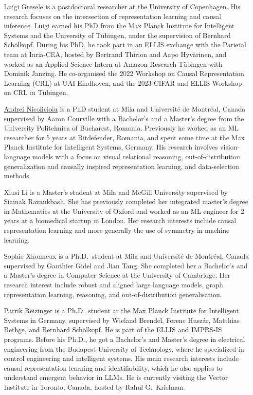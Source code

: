 \documentclass{article}
\begin{document}
Luigi Gresele is a postdoctoral researcher at the University of Copenhagen. His research focuses on the intersection of representation learning and causal inference. Luigi earned his PhD from the Max Planck Institute for Intelligent Systems and the University of Tübingen, under the supervision of Bernhard Schölkopf. During his PhD, he took part in an ELLIS exchange with the Parietal team at Inria-CEA, hosted by Bertrand Thirion and Aapo Hyvärinen, and worked as an Applied Science Intern at Amazon Research Tübingen with Dominik Janzing. He co-organised the 2022 Workshop on Causal Representation Learning (CRL) at UAI Eindhoven, and the 2023 CIFAR and ELLIS Workshop on CRL in T\"ubingen.


\href{https://andreinicolicioiu.github.io/}{Andrei Nicolicioiu}
is a PhD student at Mila and Université de Montréal, Canada supervised by Aaron Courville with a Bachelor’s and a Master’s degree from the University Politehnica of Bucharest, Romania. Previously he worked as an ML researcher for 5 years at Bitdefender, Romania, and spent some time at the Max Planck Institute for Intelligent Systems, Germany. His research involves vision-language models with a focus on visual relational reasoning, out-of-distribution generalization and causally inspired representation learning, and data-selection methods.

Xiusi Li is a Master's student at Mila and McGill University supervised by Siamak Ravankbash. She has previously completed her integrated master's degree in Mathematics at the University of Oxford and worked as an ML engineer for 2 years at a biomedical startup in London. Her research interests include causal representation learning and more generally the use of symmetry in machine learning.

Sophie Xhonneux is a Ph.D.\ student at Mila and Universit\'{e} de Montr\'{e}al, Canada supervised by Gauthier Gidel and Jian Tang. She completed her a Bachelor's and a Master's degree in Computer Science at the University of Cambridge. Her research interest include robust and aligned large language models, graph representation learning, reasoning, and out-of-distribution generalisation.


Patrik Reizinger is a Ph.D.\ student at the Max Planck Institute for Intelligent Systems in Germany, supervised by Wieland Brendel, Ferenc Huszár, Matthias Bethge, and Bernhard Schölkopf. He is part of the ELLIS and IMPRS-IS programs. Before his Ph.D., he got a Bachelor's and Master's degree in electrical engineering from the Budapest University of Technology, where he specialized in control engineering and intelligent systems. His main research interests include causal representation learning and identifiability, which he also applies to understand emergent behavior in LLMs. He is currently visiting the Vector Institute in Toronto, Canada, hosted by Rahul G.~Krishnan.
\end{document}
